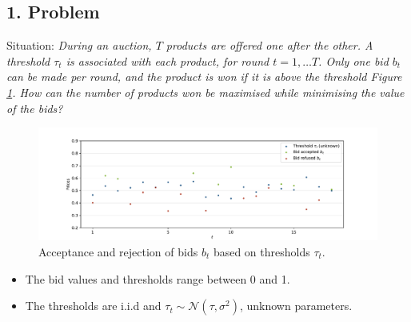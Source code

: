\documentclass[
]{ImperialPoster}
\begin{document}

\titlesection %

\medskip %

\begin{multicols}{2} %
	
	
	\subsection{1. Problem}
	\textcolor{ICLBlue}{Situation:} \textit{During an auction, $T$ products are offered one after the other. A \textcolor{ICLBlue}{threshold} $\tau_t$ is associated with each product, for round $t = 1, \dots T$. 
	Only one \textcolor{ICLBlue}{bid} $b_t$ can be made per round, and the product is won if it is above the threshold Figure \ref{fig:bid_threshold}. How can the number of products won be maximised while minimising the value of the bids?}\\
	\begin{figure}[H] %
		\includegraphics[width=\linewidth]{"../../../../figures/bid_threshold.pdf"} %
		\caption{Acceptance and rejection of bids $b_t$ based on thresholds $\tau_t$.}
		\label{fig:bid_threshold}
	\end{figure}
	\begin{itemize}
		\item The bid values and thresholds range between 0 and 1.
		\item The thresholds are i.i.d and $\tau_t \sim \mathcal{N}(\tau, \sigma^2)$, unknown parameters.

\end{itemize}
\end{multicols}
\end{document}
